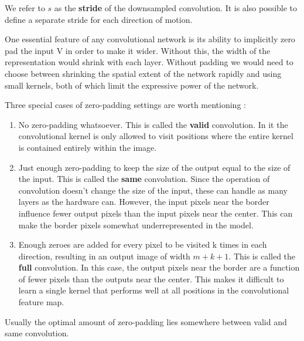 \documentclass[onecolumn, letterpaper, 12pt]{report}
\begin{document}
We refer to $s$ as the \textbf{stride} of the downsampled convolution. It is also possible to define a separate stride for each direction of motion. 

One essential feature of any convolutional network is its ability to implicitly zero pad the input V in order to make it wider. Without this, the width of the representation would shrink with each layer. Without padding we would need to choose between shrinking the spatial extent of the network rapidly and using small kernels, both of which limit the expressive power of the network. 

Three special cases of zero-padding settings are worth mentioning :


\begin{enumerate}

\item No zero-padding whatsoever. This is called the \textbf{valid} convolution. In it the convolutional kernel is only allowed to visit positions where the entire kernel is contained entirely within the image. 

\item Just enough zero-padding to keep the size of the output equal to the size of the input. This is called the \textbf{same} convolution. Since the operation of convolution doesn't change the size of the input, these can handle as many layers as the hardware can. However, the input pixels near the border influence fewer output pixels than the input pixels near the center. This can make the border pixels somewhat underrepresented in the model. 

\item Enough zeroes are added for every pixel to be visited k times in each direction, resulting in an output image of width $m + k + 1$. This is called the \textbf{full} convolution. In this case, the output pixels near the border are a function of fewer pixels than the outputs near the center. This makes it difficult to learn a single kernel that performs well at all positions in the convolutional feature map. 

\end{enumerate}


Usually the optimal amount of zero-padding lies somewhere between valid and same convolution. 
\end{document}
